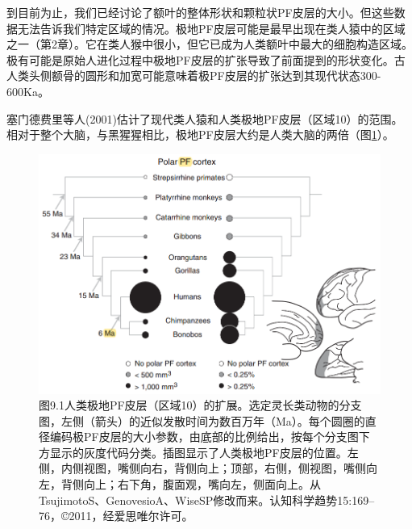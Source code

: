 \par
到目前为止，我们已经讨论了额叶的整体形状和颗粒状PF皮层的大小。但这些数据无法告诉我们特定区域的情况。极地PF皮层可能是最早出现在类人猿中的区域之一（第2章）。它在类人猴中很小，但它已成为人类额叶中最大的细胞构造区域。极有可能是原始人进化过程中极地PF皮层的扩张导致了前面提到的形状变化。古人类头侧额骨的圆形和加宽可能意味着极PF皮层的扩张达到其现代状态300-600Ka。
\par
塞门德费里等人(2001)估计了现代类人猿和人类极地PF皮层（区域10）的范围。相对于整个大脑，与黑猩猩相比，极地PF皮层大约是人类大脑的两倍（图\ref{fig:fig_9_1}）。
\par
\begin{figure}[!htb]
	\centering
	\includegraphics[width=0.5\linewidth]{image_pfc/Fig_9_1}
	\caption{图9.1人类极地PF皮层（区域10）的扩展。选定灵长类动物的分支图，左侧（箭头）的近似发散时间为数百万年（Ma）。每个圆圈的直径编码极PF皮层的大小参数，由底部的比例给出，按每个分支图下方显示的灰度代码分类。插图显示了人类极地PF皮层的位置。左侧，内侧视图，嘴侧向右，背侧向上；顶部，右侧，侧视图，嘴侧向左，背侧向上；右下角，腹面观，嘴向左，侧面向上。从TsujimotoS、GenovesioA、WiseSP修改而来。认知科学趋势15:169–76，©2011，经爱思唯尔许可。\label{fig:fig_9_1}}
\end{figure}

